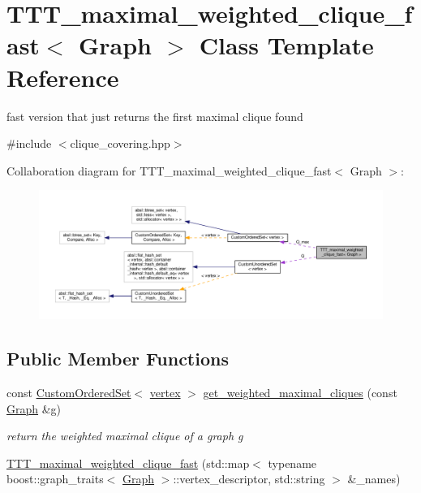 \hypertarget{classTTT__maximal__weighted__clique__fast}{}\section{T\+T\+T\+\_\+maximal\+\_\+weighted\+\_\+clique\+\_\+fast$<$ Graph $>$ Class Template Reference}
\label{classTTT__maximal__weighted__clique__fast}


fast version that just returns the first maximal clique found  




{\ttfamily \#include $<$clique\+\_\+covering.\+hpp$>$}



Collaboration diagram for T\+T\+T\+\_\+maximal\+\_\+weighted\+\_\+clique\+\_\+fast$<$ Graph $>$\+:
\nopagebreak
\begin{figure}[H]
\begin{center}
\leavevmode
\includegraphics[width=350pt]{d7/d6a/classTTT__maximal__weighted__clique__fast__coll__graph}
\end{center}
\end{figure}
\subsection*{Public Member Functions}
\begin{DoxyCompactItemize}
\item 
const \hyperlink{classCustomOrderedSet}{Custom\+Ordered\+Set}$<$ \hyperlink{classTTT__maximal__weighted__clique__fast_a55ca1f8931415f7338827925b86c218d}{vertex} $>$ \hyperlink{classTTT__maximal__weighted__clique__fast_af875360ed6a8408976791c7d39adada9}{get\+\_\+weighted\+\_\+maximal\+\_\+cliques} (const \hyperlink{structGraph}{Graph} \&g)
\begin{DoxyCompactList}\small\item\em return the weighted maximal clique of a graph g \end{DoxyCompactList}\item 
\hyperlink{classTTT__maximal__weighted__clique__fast_a05d338d4883a68f5d9c00198927a06b5}{T\+T\+T\+\_\+maximal\+\_\+weighted\+\_\+clique\+\_\+fast} (std\+::map$<$ typename boost\+::graph\+\_\+traits$<$ \hyperlink{structGraph}{Graph} $>$\+::vertex\+\_\+descriptor, std\+::string $>$ \&\+\_\+names)
\end{DoxyCompactItemize}

